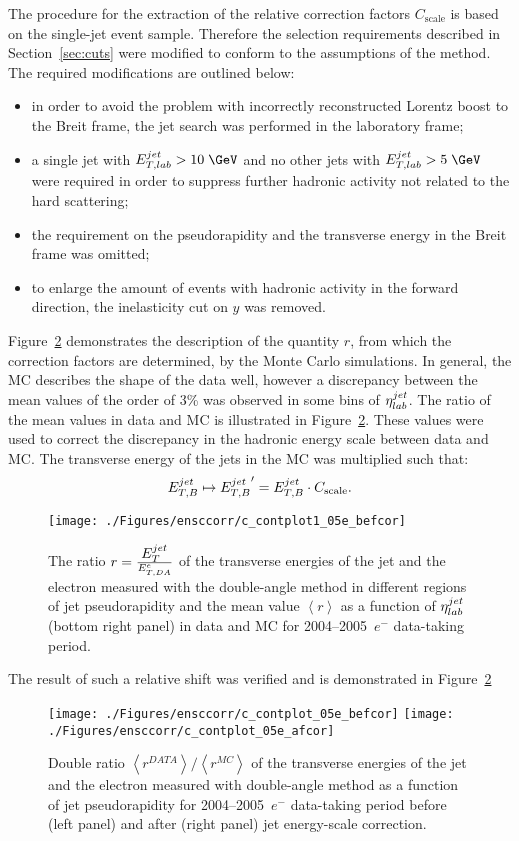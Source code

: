 The procedure for the extraction of the relative correction factors $C_\text{scale}$ is based on the single-jet event sample. Therefore the selection requirements described in Section~\ref{sec:cuts} were modified to conform to the assumptions of the method. The required modifications are outlined below: 
\begin{itemize}
	\item in order to avoid the problem with incorrectly reconstructed Lorentz boost to the Breit frame, the jet search was performed in the laboratory frame;
	\item a single jet with $\etjetlab > 10\; \GeV$ and no other jets with $\etjetlab > 5\; \GeV$ were required in order to suppress further hadronic activity not related to the hard scattering;
	\item the requirement on the pseudorapidity and the transverse energy in the Breit frame was omitted;
	\item to enlarge the amount of events with hadronic activity in the forward direction, the inelasticity cut on $y$ was removed.
\end{itemize}

Figure~\ref{fig:ratcalibcontrolplot} demonstrates the description of the quantity $r$, from which the correction factors are determined, by the Monte Carlo simulations. In general, the MC describes the shape of the data well, however a discrepancy between the mean values of the order of 3\% was observed in some bins of $\mbox{$\eta^{jet}_{lab}$}$. The ratio of the mean values in data and MC is illustrated in Figure~\ref*{fig:ratcalibcontrolplot}. These values were used to correct the discrepancy in the hadronic energy scale between data and MC. The transverse energy of the jets in the MC was multiplied such that:
\begin{equation}
 \mbox{$E_{T,B}^{jet}$} \mapsto \mbox{$E_{T,B}^{jet}$}' = \mbox{$E_{T,B}^{jet}$} \cdot C_\text{scale}.
\end{equation}
\begin{figure}[htbp]
	\centering
		\texttt{[image: ./Figures/ensccorr/c\_contplot1\_05e\_befcor]} 
	\caption{The ratio $r=\frac{\mbox{$E_T^{jet}$}}{E_{T,DA}^e}$ of the transverse energies of the jet and the electron measured with the double-angle method in different regions of jet pseudorapidity and the mean value $\left\langle r\right\rangle$ as a function of $\mbox{$\eta^{jet}_{lab}$}$ (bottom right panel) in data and MC for 2004--2005~$e^-$ data-taking period.}
	\label{fig:ratcalibcontrolplot}
\end{figure}
The result of such a relative shift was verified and is demonstrated in Figure~\ref*{fig:ratcalibcontrolplot}
\begin{figure}[htbp]
	\centering
		\texttt{[image: ./Figures/ensccorr/c\_contplot\_05e\_befcor]} 
		\texttt{[image: ./Figures/ensccorr/c\_contplot\_05e\_afcor]} 
	\caption{Double ratio $\left\langle r^{DATA}\right\rangle/\left\langle r^{MC}\right\rangle$ of the transverse energies of the jet and the electron measured with double-angle method as a function of jet pseudorapidity for 2004--2005~$e^-$ data-taking period before (left panel) and after (right panel) jet energy-scale correction.}
	\label{fig:ratcalibcontrolplot}
\end{figure}

